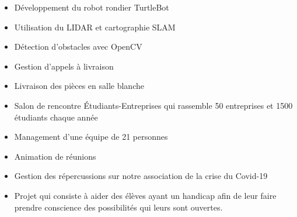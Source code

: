 \documentclass[10pt,a4paper,ragged2e,withhyper]{altacv}
\begin{document}
\begin{paracol}{2}


\begin{itemize} 
\item Développement du robot rondier TurtleBot
\item Utilisation du LIDAR et cartographie SLAM
\item Détection d'obstacles avec OpenCV
\end{itemize}

\divider
\newpage

\begin{itemize}
\item Gestion d'appels à livraison
\item Livraison des pièces en salle blanche 
\end{itemize}

\hardivider


\begin{itemize}
\item Salon de rencontre Étudiants-Entreprises qui rassemble 50 entreprises et 1500 étudiants chaque année
\item Management d'une équipe de 21 personnes
\item Animation de réunions
\item Gestion des répercussions sur notre association de la crise du Covid-19
\end{itemize}

\divider
\medskip


\begin{itemize}
    \item Projet qui consiste à aider des élèves ayant un handicap afin de leur faire prendre conscience des possibilités qui leurs sont ouvertes. 
\end{itemize}

\divider
\medskip



\end{paracol}
\end{document}
